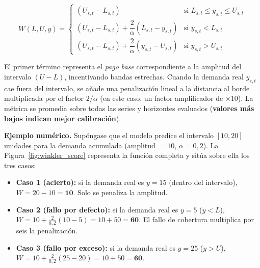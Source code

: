 \begin{equation}
    W(L, U, y) = \begin{cases}
        (U_{s,t} - L_{s,t}) & \text{si } L_{s,t} \le y_{s,t} \le U_{s,t} \\[4pt]
        (U_{s,t} - L_{s,t}) + \dfrac{2}{\alpha}(L_{s,t} - y_{s,t})
        & \text{si } y_{s,t} < L_{s,t} \\[4pt]
        (U_{s,t} - L_{s,t}) + \dfrac{2}{\alpha}(y_{s,t} - U_{s,t})
        & \text{si } y_{s,t} > U_{s,t}
    \end{cases}
\end{equation}

El primer término representa el \emph{pago base} correspondiente a la amplitud del intervalo $(U - L)$, incentivando bandas estrechas. Cuando la demanda real $y_{s,t}$ cae fuera del intervalo, se añade una penalización lineal a la distancia al borde multiplicada por el factor $2/\alpha$ (en este caso, un factor amplificador de $\times 10$). La métrica se promedia sobre todas las series y horizontes evaluados (\textbf{valores más bajos indican mejor calibración}).

\medskip
\noindent\textbf{Ejemplo numérico.} Supóngase que el modelo predice el intervalo $[10, 20]$ unidades para la demanda acumulada (amplitud $= 10$, $\alpha = 0{,}2$). La Figura~\ref{fig:winkler_score} representa la función completa y sitúa sobre ella los tres casos:

\begin{itemize}
    \item \textbf{Caso 1 (acierto):} si la demanda real es $y = 15$ (dentro del intervalo), $W = 20 - 10 = \mathbf{10}$. Solo se penaliza la amplitud.
    \item \textbf{Caso 2 (fallo por defecto):} si la demanda real es $y = 5$ ($y < L$), $W = 10 + \frac{2}{0{,}2}(10 - 5) = 10 + 50 = \mathbf{60}$. El fallo de cobertura multiplica por seis la penalización.
    \item \textbf{Caso 3 (fallo por exceso):} si la demanda real es $y = 25$ ($y > U$), $W = 10 + \frac{2}{0{,}2}(25 - 20) = 10 + 50 = \mathbf{60}$.
\end{itemize}

